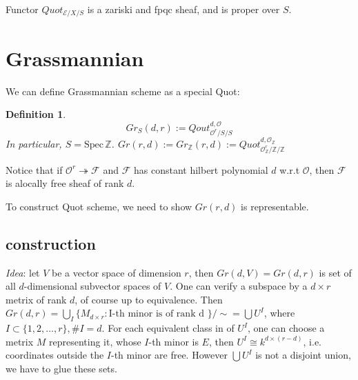\documentclass{article}
\newtheorem{defn}{Definition}[section]
\newcommand{\Spec}{\mathrm{Spec}\,}
\begin{document}
Functor $ Quot_{\mathcal{E}/X/S} $ is a zariski and fpqc sheaf, and is proper over $ S $.

\section{Grassmannian}

We can define Grassmannian scheme as a special Quot:
\begin{defn}
	$$ Gr_S(d,r):=Qout_{\mathcal{O}^r/S/S}^{d,\mathcal{O}} $$
	In particular, $ S=\Spec \mathbb{Z} $.
	$ Gr(r,d):=Gr_\mathbb{Z}(r,d):=Quot_{\mathcal{O}_\mathbb{Z}^r/\mathbb{Z}/\mathbb{Z}}^{d,\mathcal{O}_\mathbb{Z}}  $
\end{defn}

Notice that  if $ \mathcal{O}^r\twoheadrightarrow\mathcal{F} $ and $ \mathcal{F} $ has constant hilbert polynomial $ d $ w.r.t $ \mathcal{O} $, then $ \mathcal{F} $ is alocally free sheaf of rank $ d $. 

To construct Quot scheme, we need to show $ Gr(r,d) $ is representable.

\subsection{construction}
\emph{Idea}: let $ V $ be a vector space of dimension $ r $, then $ Gr(d,V)=Gr(d,r) $ is set of all $ d $-dimensional subvector spaces of $ V $. One can verify a subspace by a $ d\times r $ metrix of rank $ d $, of course up to equivalence. Then $ Gr(d,r)=\bigcup_I\{ M_{d\times r} : \text{I-th minor is of rank d }\}/\sim=\bigcup U^I $, where $ I\subset \{ 1,2,\ldots ,r \} , \#I=d $. For each equivalent class in of $ U^I $, one can choose a metrix $ M $ representing it, whose $ I $-th minor is $ E $, then $ U^I\cong k^{d\times (r-d)} $, i.e. coordinates outside the $ I $-th minor are free. However $ \bigcup U^I $ is not a disjoint union, we have to glue these sets.
\end{document}
